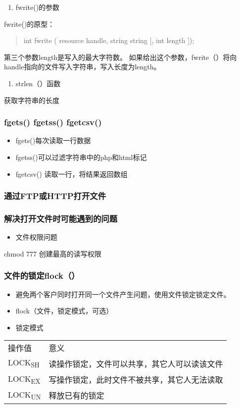 \documentclass[11pt]{article}
\begin{document}
\begin{enumerate}
\item fwrite()的参数
\end{enumerate}
fwrite()的原型：
\begin{quote}
int fwrite ( resource handle, string string [, int length ]);
\end{quote}
第三个参数length是写入的最大字符数。  如果给出这个参数，fwrite（）将向handle指向的文件写入字符串，写入长度为length。 

\begin{enumerate}
\item strlen（）函数
\end{enumerate}
获取字符串的长度
\subsubsection{fgets() fgetss() fgetcsv()}
\label{sec:org7c9fea8}
\begin{itemize}
\item fgets()每次读取一行数据
\item fgetss()可以过滤字符串中的php和html标记
\item fgetcsv() 读取一行，将结果返回数组
\end{itemize}

\subsubsection{通过FTP或HTTP打开文件}
\label{sec:org72d1d18}
\subsubsection{解决打开文件时可能遇到的问题}
\label{sec:orgb4fc548}
\begin{itemize}
\item 文件权限问题
\end{itemize}
chmod 777 创建最高的读写权限
\subsubsection{文件的锁定flock（）}
\label{sec:orgef48db3}
\begin{itemize}
\item 避免两个客户同时打开同一个文件产生问题，使用文件锁定锁定文件。
\item flock（文件，锁定模式，可选）
\item 锁定模式
\end{itemize}
\begin{center}
\begin{tabular}{ll}
操作值 & 意义\\
LOCK\textsubscript{SH} & 读操作锁定，文件可以共享，其它人可以读该文件\\
LOCK\textsubscript{EX} & 写操作锁定，此时文件不被共享，其它人无法读取\\
LOCK\textsubscript{UN} & 释放已有的锁定\\
\end{tabular}
\end{center}
\end{document}
